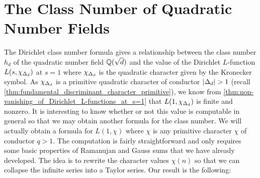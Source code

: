   \section{The Class Number of Quadratic Number Fields}
    The Dirichlet class number formula gives a relationship between the class number $h_{d}$ of the quadratic number field $\mathbb{Q}(\sqrt{d})$ and the value of the Dirichlet $L$-function $L(s,\chi_{\Delta_{d}})$ at $s = 1$ where $\chi_{\Delta_{d}}$ is the quadratic character given by the Kronecker symbol. As $\chi_{\Delta_{d}}$ is a primitive quadratic character of conductor $|\Delta_{d}| > 1$ (recall \cref{thm:fundamental_discriminant_character_primitive}), we know from \cref{thm:non-vanishing_of_Dirichlet_L-functions_at_s=1} that $L(1,\chi_{\Delta_{d}})$ is finite and nonzero. It is interesting to know whether or not this value is computable in general so that we may obtain another formula for the class number. We will actually obtain a formula for $L(1,\chi)$ where $\chi$ is any primitive character $\chi$ of conductor $q > 1$. The computation is fairly straightforward and only requires some basic properties of Ramanujan and Gauss sums that we have already developed. The idea is to rewrite the character values $\chi(n)$ so that we can collapse the infinite series into a Taylor series. Our result is the following:
    

